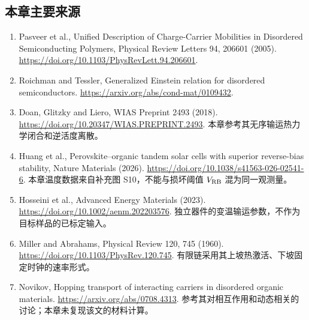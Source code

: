 \subsection{{\cjkfont 本章主要来源}\allowbreak{}}
\begin{enumerate}
\item Pasveer et al., Unified Description of Charge-Carrier Mobilities in Disordered Semiconducting Polymers, Physical Review Letters 94, 206601 (2005). \url{https://doi.org/10.1103/PhysRevLett.94.206601}.
\item Roichman and Tessler, Generalized Einstein relation for disordered semiconductors. \url{https://arxiv.org/abs/cond-mat/0109432}.
\item Doan, Glitzky and Liero, WIAS Preprint 2493 (2018). \url{https://doi.org/10.20347/WIAS.PREPRINT.2493}. {\cjkfont 本章参考其无序输运热力学闭合和逆活度离散。}\allowbreak{}
\item Huang et al., Perovskite--organic tandem solar cells with superior reverse-bias stability, Nature Materials (2026). \url{https://doi.org/10.1038/s41563-026-02541-6}. {\cjkfont 本章温度数据来自补充图}\allowbreak{} S10{\cjkfont ，不能与损坏阈值}\allowbreak{} $V_{\rm RB}$ {\cjkfont 混为同一观测量。}\allowbreak{}
\item Hosseini et al., Advanced Energy Materials (2023). \url{https://doi.org/10.1002/aenm.202203576}. {\cjkfont 独立器件的变温输运参数，不作为目标样品的已标定输入。}
\item Miller and Abrahams, Physical Review 120, 745 (1960). \url{https://doi.org/10.1103/PhysRev.120.745}. {\cjkfont 有限链采用其上坡热激活、下坡固定时钟的速率形式。}\allowbreak{}
\item Novikov, Hopping transport of interacting carriers in disordered organic materials. \url{https://arxiv.org/abs/0708.4313}. {\cjkfont 参考其对相互作用和动态相关的讨论；本章未复现该文的材料计算。}\allowbreak{}
\end{enumerate}
\FloatBarrier
\clearpage

